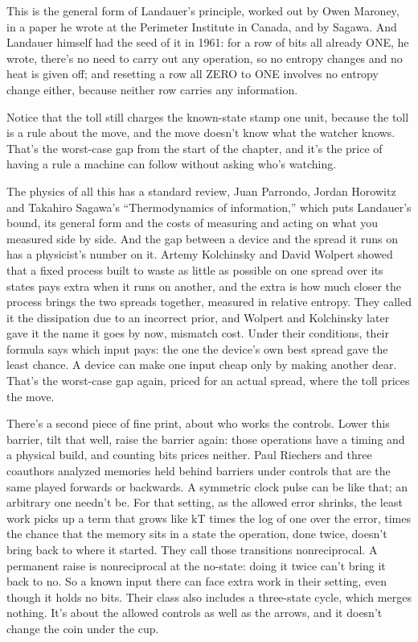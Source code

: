 \documentclass[11pt,twoside]{article}
\theoremstyle{thielethm}
\theoremstyle{thieledef}
\theoremstyle{thieledef}
\theoremstyle{thieledef}
\theoremstyle{thielethm}
\theoremstyle{thieleobs}
\theoremstyle{thielethm}
\begin{document}
This is the general form of Landauer's principle, worked out by Owen Maroney, in a paper he wrote at the Perimeter Institute in Canada, and by Sagawa. And Landauer himself had the seed of it in 1961: for a row of bits all already ONE, he wrote, there's no need to carry out any operation, so no entropy changes and no heat is given off; and resetting a row all ZERO to ONE involves no entropy change either, because neither row carries any information.

Notice that the toll still charges the known-state stamp one unit, because the toll is a rule about the move, and the move doesn't know what the watcher knows. That's the worst-case gap from the start of the chapter, and it's the price of having a rule a machine can follow without asking who's watching.

The physics of all this has a standard review, Juan Parrondo, Jordan Horowitz and Takahiro Sagawa's ``Thermodynamics of information,'' which puts Landauer's bound, its general form and the costs of measuring and acting on what you measured side by side. And the gap between a device and the spread it runs on has a physicist's number on it. Artemy Kolchinsky and David Wolpert showed that a fixed process built to waste as little as possible on one spread over its states pays extra when it runs on another, and the extra is how much closer the process brings the two spreads together, measured in relative entropy. They called it the dissipation due to an incorrect prior, and Wolpert and Kolchinsky later gave it the name it goes by now, mismatch cost. Under their conditions, their formula says which input pays: the one the device's own best spread gave the least chance. A device can make one input cheap only by making another dear. That's the worst-case gap again, priced for an actual spread, where the toll prices the move.

There's a second piece of fine print, about who works the controls. Lower this barrier, tilt that well, raise the barrier again: those operations have a timing and a physical build, and counting bits prices neither. Paul Riechers and three coauthors analyzed memories held behind barriers under controls that are the same played forwards or backwards. A symmetric clock pulse can be like that; an arbitrary one needn't be. For that setting, as the allowed error shrinks, the least work picks up a term that grows like kT times the log of one over the error, times the chance that the memory sits in a state the operation, done twice, doesn't bring back to where it started. They call those transitions nonreciprocal. A permanent raise is nonreciprocal at the no-state: doing it twice can't bring it back to no. So a known input there can face extra work in their setting, even though it holds no bits. Their class also includes a three-state cycle, which merges nothing. It's about the allowed controls as well as the arrows, and it doesn't change the coin under the cup.
\end{document}
